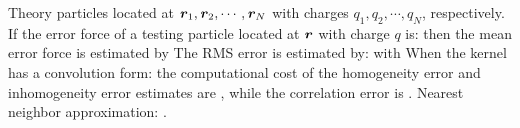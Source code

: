 \documentclass[final,hyperref={pdfpagelabels=false},fleqn]{beamer}
\begin{document}
\begin{frame}{}
\begin{columns}[t]
\begin{column}{.48\linewidth}
\begin{block}{Theory}
        particles located at $\textbf{\textit{r}}_1, \textbf{\textit{r}}_2, \cdots, \textbf{\textit{r}}_N$ with
        charges $q_1, q_2, \cdots, q_N$, respectively. If the error
        force of a testing particle located at $\textbf{\textit{r}}$ with charge $q$
        is: 
        then the mean error force is estimated by
        The RMS error is estimated by:
        with
        When the kernel has a convolution form:
        the computational cost of the homogeneity error and inhomogeneity error estimates are
        , while the correlation error
        is . Nearest neighbor approximation: .        

\end{block}
\end{column}
\end{columns}
\end{frame}
\end{document}

